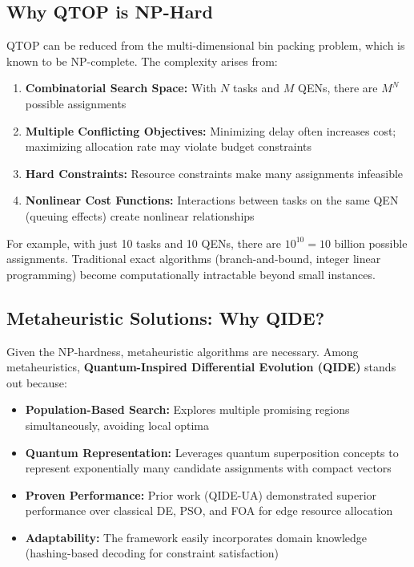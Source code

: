 \documentclass[12pt,a4paper]{article}
\begin{document}
\subsection{Why QTOP is NP-Hard}

QTOP can be reduced from the multi-dimensional bin packing problem, which is known to be NP-complete. The complexity arises from:

\begin{enumerate}
  \item \textbf{Combinatorial Search Space:} With $N$ tasks and $M$ QENs, there are $M^N$ possible assignments
  \item \textbf{Multiple Conflicting Objectives:} Minimizing delay often increases cost; maximizing allocation rate may violate budget constraints
  \item \textbf{Hard Constraints:} Resource constraints make many assignments infeasible
  \item \textbf{Nonlinear Cost Functions:} Interactions between tasks on the same QEN (queuing effects) create nonlinear relationships
\end{enumerate}

For example, with just 10 tasks and 10 QENs, there are $10^{10} = 10$ billion possible assignments. Traditional exact algorithms (branch-and-bound, integer linear programming) become computationally intractable beyond small instances.

\subsection{Metaheuristic Solutions: Why QIDE?}

Given the NP-hardness, metaheuristic algorithms are necessary. Among metaheuristics, \textbf{Quantum-Inspired Differential Evolution (QIDE)} stands out because:

\begin{itemize}
  \item \textbf{Population-Based Search:} Explores multiple promising regions simultaneously, avoiding local optima
  \item \textbf{Quantum Representation:} Leverages quantum superposition concepts to represent exponentially many candidate assignments with compact vectors
  \item \textbf{Proven Performance:} Prior work (QIDE-UA) demonstrated superior performance over classical DE, PSO, and FOA for edge resource allocation
  \item \textbf{Adaptability:} The framework easily incorporates domain knowledge (hashing-based decoding for constraint satisfaction)
\end{itemize}
\end{document}
